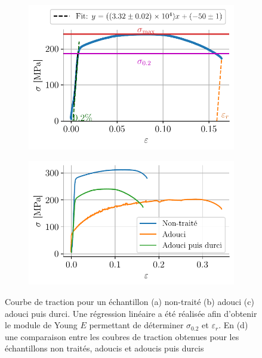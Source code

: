 \begin{figure}[h!]
\begin{subfigure}{0.48\linewidth}
        \includegraphics[width=\linewidth]{figures/tiede6all.pdf}
        \caption{}
        \label{fig:tiede6}
    \end{subfigure}
    \begin{subfigure}{0.48\linewidth}
        \centering
        \includegraphics[width=\linewidth]{figures/comparaison.pdf}
        \caption{}
        \label{fig:comparaison}
    \end{subfigure}
    \caption{Courbe de traction pour un échantillon (a) non-traité (b) adouci (c) adouci puis durci. Une régression linéaire a été réalisée afin d'obtenir le module de Young \(E\) permettant de déterminer \(\sigma_{0.2}\) et \(\varepsilon_r\). En (d) une comparaison entre les coubres de traction obtenues pour les échantillons non traités, adoucis et adoucis puis durcis}
    \label{fig:tractions_exp}
\end{figure}

